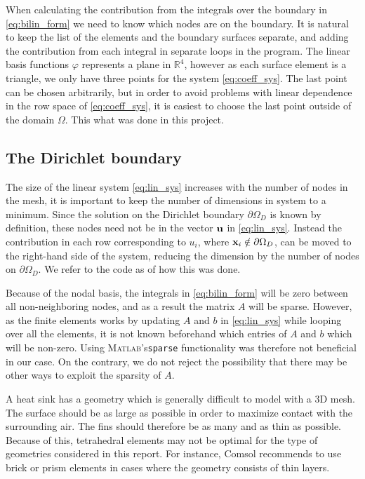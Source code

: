When calculating the contribution from the integrals over the boundary in \eqref{eq:bilin_form} we need to know which nodes are on the boundary. It is natural to keep the list of the elements and the boundary surfaces separate, and adding the contribution from each integral in separate loops in the program. The linear basis functions $\varphi$ represents a plane in $\mathbb{R}^4$, however as each surface element is a triangle, we only have three points for the system \eqref{eq:coeff_sys}. The last point can be chosen arbitrarily,  but in order to avoid problems with linear dependence in the row space of \eqref{eq:coeff_sys}, it is easiest to choose the last point outside of the domain $\Omega$. This what was done in this project.

\subsection{The Dirichlet boundary}
 The size of the linear system \eqref{eq:lin_sys} increases with the number of nodes in the mesh, it is important to keep the number of dimensions in system to a minimum. Since the solution on the Dirichlet boundary $\partial\Omega_D$ is known by definition, these nodes need not be in the vector $\vb{u}$ in \eqref{eq:lin_sys}. Instead the contribution in each row corresponding to $u_i$, where $\vb{x}_i \notin \partial\Omega_D$, can be moved to the right-hand side of the system, reducing the dimension by the number of nodes on $\partial\Omega_D$. We refer to the code as of how this was done.

 Because of the nodal basis, the integrals in \eqref{eq:bilin_form} will be zero between all non-neighboring nodes, and as a result the matrix $A$ will be sparse. However, as the finite elements works by updating $A$ and $b$ in \eqref{eq:lin_sys} while looping over all the elements, it is not known beforehand which entries of $A$ and $b$ which will be non-zero. Using \textsc{Matlab}'s\xspace \texttt{sparse} functionality was therefore not beneficial in our case. On the contrary, we do not reject the possibility that there may be other ways to exploit the sparsity of $A$.

 A heat sink has a geometry which is generally difficult to model with a 3D mesh. The surface should be as large as possible in order to maximize contact with the surrounding air. The fins should therefore be as many and as thin as possible. Because of this, tetrahedral elements may not be optimal for the type of geometries considered in this report. For instance, Comsol \cite{comsol_mesh_types} recommends to use brick or prism elements in cases where the geometry consists of thin layers.